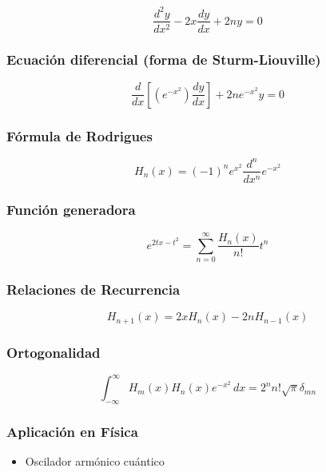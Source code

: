 \begin{equation}
\frac{d^{2}y}{dx^{2}}-2x\frac{dy}{dx}+2ny=0
\end{equation}

\subsubsection{Ecuación diferencial (forma de Sturm-Liouville)}

\begin{equation}
\frac{d}{dx}\left[\left( e^{-x^{2}}\right)\frac{dy}{dx}\right]+2ne^{-x^{2}}y=0
\end{equation}

\subsubsection{Fórmula de Rodrigues}

\begin{equation}
H_{n}(x)=(-1)^{n}e^{x^{2}}\frac{d^{n}}{dx^{n}}e^{-x^{2}}
\end{equation}

\subsubsection{Función generadora}

\begin{equation}
e^{2tx-t^{2}}=\sum_{n=0}^{\infty}\frac{H_{n}(x)}{n!}t^{n}
\end{equation}

\subsubsection{Relaciones de Recurrencia}

\begin{equation}
H_{n+1}(x)=2xH_{n}(x)-2nH_{n-1}(x)
\end{equation}

\subsubsection{Ortogonalidad}
\begin{equation}
\int_{-\infty}^{\infty}H_{m}(x)H_{n}(x)e^{-x^{2}}\,dx=2^{n}n!\sqrt{\pi}\delta_{mn}
\end{equation}

\subsubsection{Aplicación en Física}
\begin{itemize}
\item Oscilador armónico cuántico
\end{itemize}

